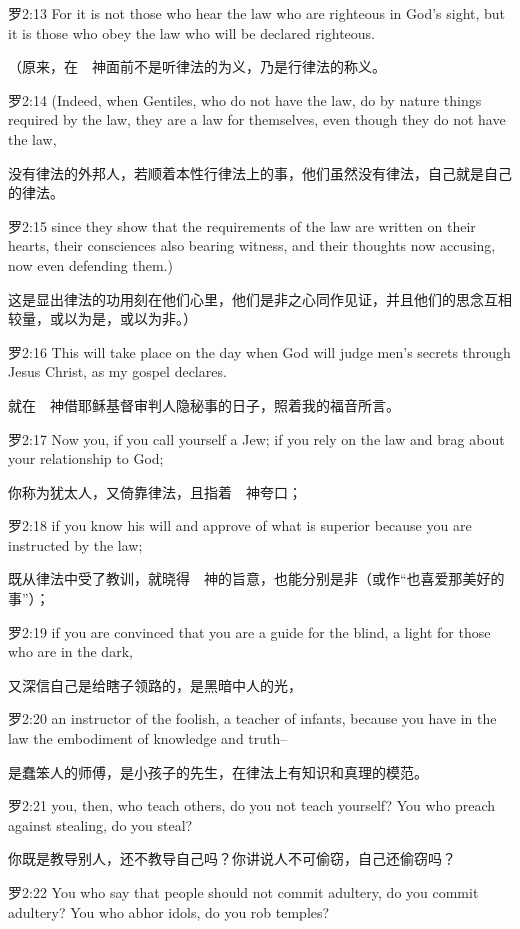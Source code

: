 \documentclass[a4paper,11pt,onecolumn,twoside]{ctexart}
\begin{document}
\begin{multicols}{2}
 罗2:13
 For it is not those who hear the law who are righteous in God's sight, but it is those who obey the law who will be declared righteous.

 （原来，在　神面前不是听律法的为义，乃是行律法的称义。


 罗2:14
 (Indeed, when Gentiles, who do not have the law, do by nature things required by the law, they are a law for themselves, even though they do not have the law,

 没有律法的外邦人，若顺着本性行律法上的事，他们虽然没有律法，自己就是自己的律法。


 罗2:15
 since they show that the requirements of the law are written on their hearts, their consciences also bearing witness, and their thoughts now accusing, now even defending them.)

 这是显出律法的功用刻在他们心里，他们是非之心同作见证，并且他们的思念互相较量，或以为是，或以为非。）


 罗2:16
 This will take place on the day when God will judge men's secrets through Jesus Christ, as my gospel declares.

 就在　神借耶稣基督审判人隐秘事的日子，照着我的福音所言。


 罗2:17
 Now you, if you call yourself a Jew; if you rely on the law and brag about your relationship to God;

 你称为犹太人，又倚靠律法，且指着　神夸口；


 罗2:18
 if you know his will and approve of what is superior because you are instructed by the law;

 既从律法中受了教训，就晓得　神的旨意，也能分别是非（或作“也喜爱那美好的事”）；


 罗2:19
 if you are convinced that you are a guide for the blind, a light for those who are in the dark,

 又深信自己是给瞎子领路的，是黑暗中人的光，


 罗2:20
 an instructor of the foolish, a teacher of infants, because you have in the law the embodiment of knowledge and truth--

 是蠢笨人的师傅，是小孩子的先生，在律法上有知识和真理的模范。


 罗2:21
 you, then, who teach others, do you not teach yourself? You who preach against stealing, do you steal?

 你既是教导别人，还不教导自己吗？你讲说人不可偷窃，自己还偷窃吗？


 罗2:22
 You who say that people should not commit adultery, do you commit adultery? You who abhor idols, do you rob temples?


\end{multicols}
\end{document}
